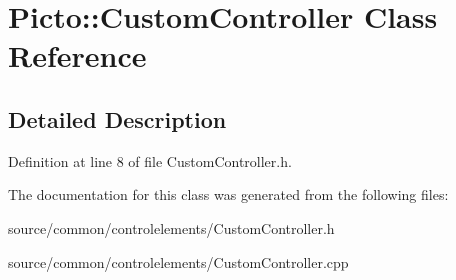 \hypertarget{class_picto_1_1_custom_controller}{\section{Picto\-:\-:Custom\-Controller Class Reference}
\label{class_picto_1_1_custom_controller}
}


\subsection{Detailed Description}


Definition at line 8 of file Custom\-Controller.\-h.



The documentation for this class was generated from the following files\-:\begin{DoxyCompactItemize}
\item 
source/common/controlelements/Custom\-Controller.\-h\item 
source/common/controlelements/Custom\-Controller.\-cpp\end{DoxyCompactItemize}
